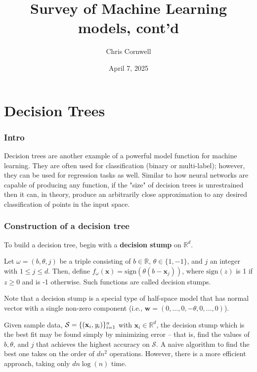 \documentclass[smaller]{beamer}
\author{Chris Cornwell}
\date{April 7, 2025}
\title{Survey of Machine Learning models, cont'd}
\theoremstyle{example}
\newcommand{\x}{\textbf{x}}
\newcommand{\ix}[1]{{\it #1}}
\begin{document}
\begin{frame}
\titlepage
\end{frame}

\section{Decision Trees}

\begin{frame}
\frametitle{Intro}
Decision trees are another example of a powerful model function for machine learning. They are often used for classification (binary or multi-label); however, they can be used for regression tasks as well. Similar to how neural networks are capable of producing any function, if the "size" of decision trees is unrestrained then it can, in theory, produce an arbitrarily close approximation to any desired classification of points in the input space.

\end{frame}

\begin{frame}
    \frametitle{Construction of a decision tree}
To build a decision tree, begin with a \textbf{decision stump} on $\mathbb R^d$. 

Let $\omega = (b, \theta, j)$ be a triple consisting of $b\in\mathbb R$, $\theta\in\{1,-1\}$, and $j$ an integer with $1\le j\le d$. Then, define $f_{\omega}(\x) = \textrm{sign}(\theta(b - \x_j))$, where $\textrm{sign}(z)$ is 1 if $z\ge 0$ and is -1 otherwise. Such functions are called decision stumps.

Note that a decision stump is a special type of half-space model that has normal vector with a single non-zero component (i.e., $\textbf{w} = (0,\ldots,0,-\theta,0,\ldots,0)$). 

Given sample data, $\mathcal S = \{(\x_i, \ix y_i)\}_{i=1}^n$ with $\x_i\in\mathbb R^d$, the decision stump which is the best fit may be found simply by minimizing error {--} that is, find the values of $b, \theta$, and $j$ that achieves the highest accuracy on $\mathcal S$. A naive algorithm to find the best one takes on the order of $dn^2$ operations. However, there is a more efficient approach, taking only $dn\log(n)$ time.
\end{frame}
\end{document}
